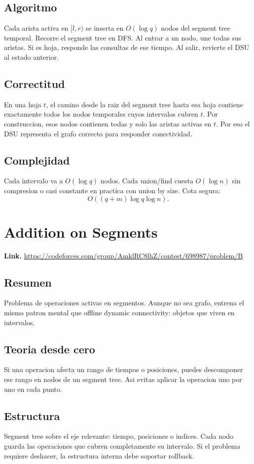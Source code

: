\documentclass[10pt]{article}
\newcommand{\bigO}{O}
\begin{document}
\subsection*{Algoritmo}
Cada arista activa en $[l,r)$ se inserta en $\bigO(\log q)$ nodos del segment
tree temporal. Recorre el segment tree en DFS. Al entrar a un nodo, une todas
sus aristas. Si es hoja, responde las consultas de ese tiempo. Al salir, revierte
el DSU al estado anterior.

\subsection*{Correctitud}
En una hoja $t$, el camino desde la raiz del segment tree hasta esa hoja contiene
exactamente todos los nodos temporales cuyos intervalos cubren $t$. Por
construccion, esos nodos contienen todas y solo las aristas activas en $t$. Por
eso el DSU representa el grafo correcto para responder conectividad.

\subsection*{Complejidad}
Cada intervalo va a $\bigO(\log q)$ nodos. Cada union/find cuesta $\bigO(\log n)$
sin compresion o casi constante en practica con union by size. Cota segura:
\[
\bigO((q+m)\log q \log n).
\]

\clearpage
\section{Addition on Segments}
\textbf{Link.} \url{https://codeforces.com/group/AmklRC8lhZ/contest/698987/problem/B}

\subsection*{Resumen}
Problema de operaciones activas en segmentos. Aunque no sea grafo, entrena el
mismo patron mental que offline dynamic connectivity: objetos que viven en
intervalos.

\subsection*{Teoria desde cero}
Si una operacion afecta un rango de tiempos o posiciones, puedes descomponer ese
rango en nodos de un segment tree. Asi evitas aplicar la operacion uno por uno
en cada punto.

\subsection*{Estructura}
Segment tree sobre el eje relevante: tiempo, posiciones o indices. Cada nodo
guarda las operaciones que cubren completamente su intervalo. Si el problema
requiere deshacer, la estructura interna debe soportar rollback.
\end{document}
